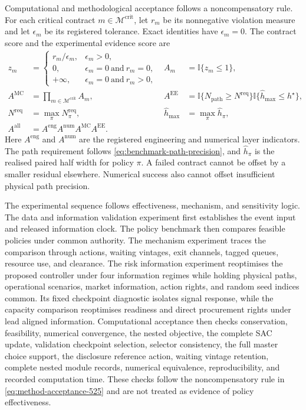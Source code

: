 \documentclass[a4paper,fleqn]{cas-sc}
\begin{document}
Computational and methodological acceptance follows a noncompensatory rule.
For each critical contract $m\in\mathcal M^{\mathrm{crit}}$, let $r_m$ be its
nonnegative violation measure and let $\epsilon_m$ be its registered tolerance.
Exact identities have $\epsilon_m=0$. The contract score and the experimental
evidence score are
\begin{subequations}\label{eq:method-acceptance-525}
\begin{align}
 z_m&=
 \begin{cases}
 r_m/\epsilon_m,&\epsilon_m>0,\\
 0,&\epsilon_m=0\ \text{and}\ r_m=0,\\
 +\infty,&\epsilon_m=0\ \text{and}\ r_m>0,
 \end{cases}
 &A_m&=\mathbb I\{z_m\leq1\},\\
 A^{\mathrm{MC}}&=\prod_{m\in\mathcal M^{\mathrm{crit}}}A_m,
 &A^{\mathrm{EE}}&=
 \mathbb I\{N_{\mathrm{path}}\geq N^{\mathrm{req}}\}
 \mathbb I\{\widehat h_{\max}\leq h^\star\},\\
 N^{\mathrm{req}}&=\max_\pi N^{\mathrm{req}}_\pi,
 &\widehat h_{\max}&=\max_\pi \widehat h_\pi,\\
 A^{\mathrm{all}}&=A^{\mathrm{eng}}A^{\mathrm{num}}
 A^{\mathrm{MC}}A^{\mathrm{EE}}.
\end{align}
\end{subequations}
Here $A^{\mathrm{eng}}$ and $A^{\mathrm{num}}$ are the registered engineering
and numerical layer indicators. The path requirement follows
\cref{eq:benchmark-path-precision}, and $\widehat h_\pi$ is the realised paired
half width for policy $\pi$. A failed contract cannot be offset by a smaller
residual elsewhere. Numerical success also cannot offset insufficient physical
path precision.

The experimental sequence follows effectiveness, mechanism, and sensitivity
logic. The data and information validation experiment first establishes the
event input and released information clock. The policy benchmark then compares
feasible policies under common authority. The mechanism experiment traces the
comparison through actions, waiting vintages, exit channels, tagged queues,
resource use, and clearance. The risk information experiment reoptimises the
proposed controller under four information regimes while holding physical
paths, operational scenarios, market information, action rights, and random
seed indices common. Its fixed checkpoint diagnostic isolates signal response,
while the capacity comparison reoptimises readiness and direct procurement
rights under lead aligned information. Computational acceptance then checks
conservation, feasibility, numerical convergence, the nested objective, the
complete SAC update, validation checkpoint selection, selector consistency,
the full master choice support, the disclosure reference action, waiting
vintage retention, complete nested module records, numerical equivalence,
reproducibility, and recorded computation time. These checks follow the
noncompensatory rule in \cref{eq:method-acceptance-525} and are not treated as
evidence of policy effectiveness.
\end{document}
